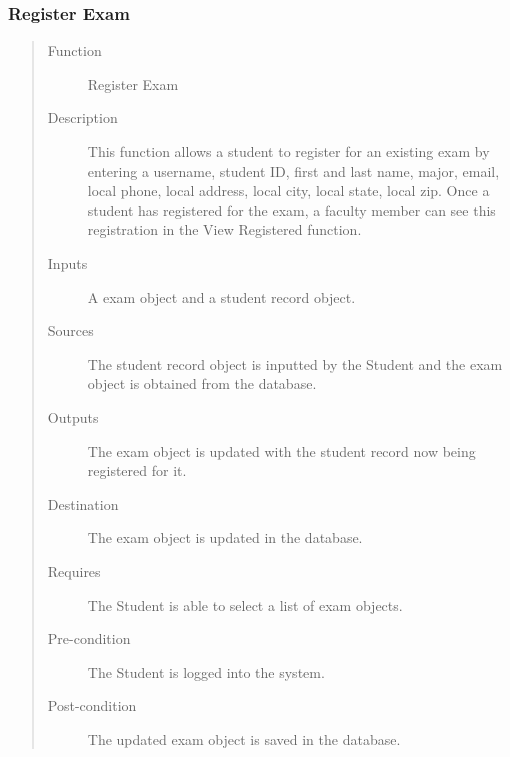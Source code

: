 \subsubsection{Register Exam} 
\begin{quote} %
\begin{description}
\item[Function]
   Register Exam
\item[Description]
   This function allows a student to register for an existing exam by entering a
   username, student ID, first and last name, major, email, local phone, local
   address, local city, local state, local zip.  Once a student has registered
   for the exam, a faculty member can see this registration in the View
   Registered function.
\item[Inputs]
   A exam object and a student record object.
\item[Sources]
   The student record object is inputted by the Student and the exam object is
   obtained from the database.
\item[Outputs]
   The exam object is updated with the student record now being registered for
   it.
\item[Destination]
   The exam object is updated in the database.
\item[Requires]
   The Student is able to select a list of exam objects.
\item[Pre-condition]
   The Student is logged into the system.
\item[Post-condition]
   The updated exam object is saved in the database.
\end{description}
\end{quote} %

